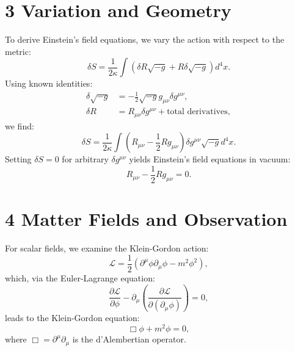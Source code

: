 \documentclass[11pt, a4paper]{book}
\begin{document}
\section*{3 Variation and Geometry}
To derive Einstein’s field equations, we vary the action with respect to the metric:
\begin{equation} \label{eq:variation_eh}
\delta S = \frac{1}{2\kappa} \int \left( \delta R\sqrt{-g} + R\delta\sqrt{-g} \right) d^4x.
\end{equation}
Using known identities:
\begin{align}
\delta\sqrt{-g} &= -\frac{1}{2}\sqrt{-g} g_{\mu\nu}\delta g^{\mu\nu}, \label{eq:identity_g_determinant_variation} \\
\delta R &= R_{\mu\nu}\delta g^{\mu\nu} + \text{total derivatives}, \label{eq:identity_R_variation}
\end{align}
we find:
\begin{equation} \label{eq:variation_eh_simplified}
\delta S = \frac{1}{2\kappa} \int \left( R_{\mu\nu} - \frac{1}{2}Rg_{\mu\nu} \right) \delta g^{\mu\nu}\sqrt{-g} d^4x.
\end{equation}
Setting $\delta S = 0$ for arbitrary $\delta g^{\mu\nu}$ yields Einstein’s field equations in vacuum:
\begin{equation} \label{eq:einstein_field_equations}
R_{\mu\nu} - \frac{1}{2}Rg_{\mu\nu} = 0.
\end{equation}

\section*{4 Matter Fields and Observation}
For scalar fields, we examine the Klein-Gordon action:
\begin{equation} \label{eq:action_kg}
\mathcal{L} = \frac{1}{2} \left( \partial^\mu\phi \partial_\mu\phi - m^2\phi^2 \right),
\end{equation}
which, via the Euler-Lagrange equation:
\begin{equation} \label{eq:euler_lagrange_scalar}
\frac{\partial\mathcal{L}}{\partial\phi} - \partial_\mu \left( \frac{\partial\mathcal{L}}{\partial(\partial_\mu\phi)} \right) = 0,
\end{equation}
leads to the Klein-Gordon equation:
\begin{equation} \label{eq:klein_gordon_equation}
\Box\phi + m^2\phi = 0,
\end{equation}
where $\Box = \partial^\mu\partial_\mu$ is the d’Alembertian operator.
\end{document}
